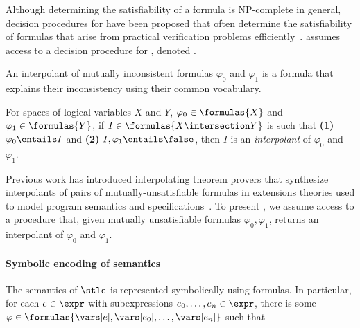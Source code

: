 Although determining the satisfiability of a \lia formula is
NP-complete in general, decision procedures for \lia have been
proposed that often determine the satisfiability of formulas that
arise from practical verification problems
efficiently~\cite{demoura08}.
%
\sys assumes access to a decision procedure for \lia, denoted \issat.

An interpolant of mutually inconsistent formulas $\varphi_0$ and
$\varphi_1$ is a \lia formula that explains their inconsistency using
their common vocabulary.
%
\begin{defn}
  \label{defn:itps}
  For spaces of logical variables $X$ and $Y$,
  $\varphi_0 \in \formulas{X}$ and
  $\varphi_1 \in \formulas{Y}$,
  if $I \in \formulas{X \intersection Y}$ is such that 
  \textbf{(1)} $\varphi_0 \entails I$ and %
  \textbf{(2)} $I, \varphi_1 \entails \false$, then $I$ is an
  \emph{interpolant} of $\varphi_0$ and $\varphi_1$.
\end{defn}
%
Previous work has introduced interpolating theorem provers that
synthesize interpolants of pairs of mutually-unsatisfiable formulas in
extensions theories used to model program semantics and
specifications~\cite{mcmillan04}.
%
To present \sys, we assume access to a procedure \solveitp that, given
mutually unsatisfiable \lia formulas $\varphi_0, \varphi_1$, returns
an interpolant of $\varphi_0$ and $\varphi_1$.


\paragraph{Symbolic encoding of semantics}
%
The semantics of $\stlc$ is represented symbolically using \lia
formulas.
%
%
In particular, for each $e \in \expr$ with subexpressions $e_0,
\ldots, e_n \in \expr$, there is some $\varphi \in \formulas{\vars[e],
  \vars[e_0], \ldots, \vars[e_n]}$ such that


